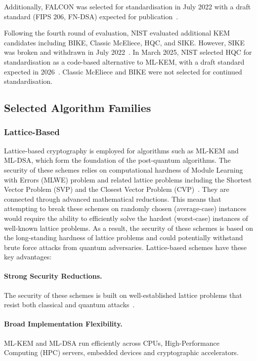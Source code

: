 \documentclass[12pt,a4paper]{article}
\begin{document}
Additionally, FALCON was selected for standardisation in July 2022 with a draft standard (FIPS 206, FN-DSA) expected for publication~\cite{nist-falcon-selection-2022}.

Following the fourth round of evaluation, NIST evaluated additional KEM candidates including BIKE, Classic McEliece, HQC, and SIKE. However, SIKE was broken and withdrawn in July 2022~\cite{sike-broken-2022}. In March 2025, NIST selected HQC for standardisation as a code-based alternative to ML-KEM, with a draft standard expected in 2026~\cite{nist-hqc-selection-2025,nist-ir8545-2025}. Classic McEliece and BIKE were not selected for continued standardisation.

\subsection{Selected Algorithm Families}

\subsubsection{Lattice-Based}

Lattice-based cryptography is employed for algorithms such as ML-KEM and ML-DSA, which form the foundation of the post-quantum algorithms. The security of these schemes relies on computational hardness of Module Learning with Errors (MLWE) problem and related lattice problems including the Shortest Vector Problem (SVP) and the Closest Vector Problem (CVP)~\cite{nist-fips-203-2024,nist-fips-204-2024}. They are connected through advanced mathematical reductions. This means that attempting to break these schemes on randomly chosen (average-case) instances would require the ability to efficiently solve the hardest (worst-case) instances of well-known lattice problems. As a result, the security of these schemes is based on the long-standing hardness of lattice problems and could potentially withstand brute force attacks from quantum adversaries. Lattice-based schemes have these key advantages:

\paragraph*{Strong Security Reductions.}
The security of these schemes is built on well-established lattice problems that resist both classical and quantum attacks~\cite{nist-fips-203-2024}.

\paragraph*{Broad Implementation Flexibility.}
ML-KEM and ML-DSA run efficiently across CPUs, High-Performance Computing (HPC) servers, embedded devices and cryptographic accelerators.
\end{document}
